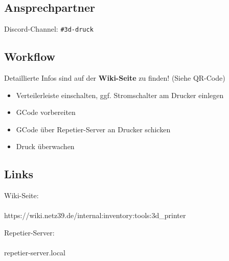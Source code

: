 \documentclass{article}
\begin{document}
		\noindent\dotfill
	\subsection*{Ansprechpartner}
	Discord-Channel: \colorbox{gray!30}{\texttt{\#3d-druck}}
	\vspace{0.5em}\\
	
	\noindent\dotfill
	\subsection*{Workflow}
	Detaillierte Infos sind auf der\textbf{ Wiki-Seite} zu finden! (Siehe QR-Code)
	\begin{itemize}
		\item Verteilerleiste einschalten, ggf. Stromschalter am Drucker einlegen
		\item GCode vorbereiten
		\item GCode über Repetier-Server an Drucker schicken
		\item Druck überwachen
	\end{itemize}	
	
	\noindent\dotfill
	\subsection*{Links}
	\begin{minipage}{0.4\textwidth}
		\centering
		Wiki-Seite:\\[0.5em]
		\\[0.5em]
		https://wiki.netz39.de/internal:inventory:tools:3d\_printer\\
		[0.5em]
	\end{minipage}
	\hfill
	\begin{minipage}{0.4\textwidth}
		\centering
		Repetier-Server:\\[0.5em]
		\\[0.5em]
		repetier-server.local \\
	\end{minipage}\\
	
	\noindent\dotfill\\
	
\end{document}
